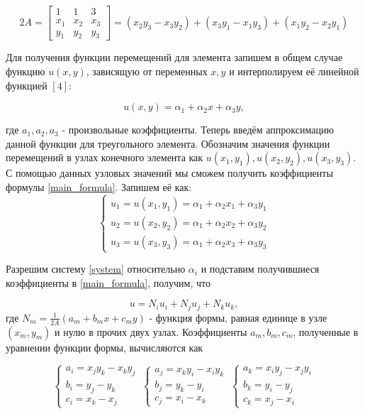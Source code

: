 \documentclass[a4paper, 14pt]{extarticle}
\begin{document}
\begin{equation*}
2A = 
\begin{bmatrix}
1 & 1 & 3\\
x_1 & x_2 & x_3 \\ 
y_1 & y_2 & y_3
\end{bmatrix}
= (x_2 y_3 - x_3 y_2) + (x_3 y_1 - x_1 y_3) + (x_1 y_2 - x_2 y_1)
\end{equation*}

\newpage

Для получения функции перемещений для элемента запишем в общем случае функцию $u(x, y)$, зависящую от переменных $x, y$ и интерполируем её линейной функцией $\left[4\right]$:

\begin{equation}\label{main_formula}
u(x, y) = \alpha_1 + \alpha_2 x + \alpha_3 y,
\end{equation} 

где $a_1, a_2, a_3$ - произвольные коэффициенты. Теперь введём аппроксимацию данной функции для треугольного элемента. Обозначим значения функции перемещений в узлах конечного элемента как $u(x_1, y_1), u(x_2, y_2), u(x_3, y_3)$. С помощью данных узловых значений мы сможем получить коэффициенты формулы \ref{main_formula}. Запишем её как:
\begin{equation}\label{system}
\left\{\begin{matrix}
u_1 = u(x_1, y_1) = \alpha_1 + \alpha_2 x_1 + \alpha_3 y_1\\
u_2 = u(x_2, y_2) = \alpha_1 + \alpha_2 x_2 + \alpha_3 y_2 \\
u_3 = u(x_3, y_3) = \alpha_1 + \alpha_2 x_3 + \alpha_3 y_3 
\end{matrix}\right.
\end{equation}

Разрешим систему \ref{system} относительно $\alpha_i$ и подставим получившиеся коэффициенты в \ref{main_formula}, получим, что

\begin{equation*}
u = N_i u_i + N_j u_j + N_k u_k,
\end{equation*}
где $N_m = \frac{1}{2A}(a_m + b_m x + c_m y)$ - функция формы, равная единице в узле $(x_m, y_m)$ и нулю в прочих двух узлах. Коэффициенты $a_m, b_m, c_m$, полученные в уравнении функции формы, вычисляются как

\begin{equation*}
\left\{\begin{matrix}
a_i = x_j y_k - x_k y_j \\
b_i = y_j - y_k \\
c_i = x_k - x_j
\end{matrix}\right.
\
\left\{\begin{matrix}
a_j = x_k y_i - x_i y_k \\
b_j = y_k - y_i \\
c_j = x_i - x_k
\end{matrix}\right.
\
\left\{\begin{matrix}
a_k = x_i y_j - x_j y_i \\
b_k = y_i - y_j \\
c_k = x_j - x_i
\end{matrix}\right.
\end{equation*}
\end{document}
